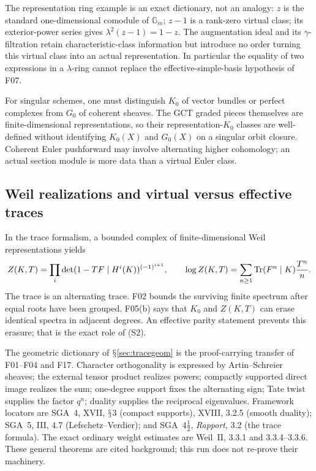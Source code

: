\documentclass[11pt,a4paper]{article}
\renewcommand{\S}{\ensuremath{\mathsection}}
\newcommand{\fid}[1]{\textsf{#1}}\newcommand{\gate}[1]{\textsf{#1}}
\theoremstyle{named}\newtheorem{finding}{Finding}[section]
\theoremstyle{definition}\newtheorem{definition}[finding]{Definition}
\theoremstyle{remark}\newtheorem{remark}[finding]{Remark}
\begin{document}
The representation ring example is an exact dictionary, not an analogy: $z$ is the standard one-dimensional comodule of $\mathbb G_m$; $z-1$ is a rank-zero virtual class; its exterior-power series gives $\lambda^2(z-1)=1-z$. The augmentation ideal and its $\gamma$-filtration retain characteristic-class information but introduce no order turning this virtual class into an actual representation. In particular the equality of two expressions in a $\lambda$-ring cannot replace the effective-simple-basis hypothesis of \fid{F07}.

For singular schemes, one must distinguish $K_0$ of vector bundles or perfect complexes from $G_0$ of coherent sheaves. The GCT graded pieces themselves are finite-dimensional representations, so their representation-$K_0$ classes are well-defined without identifying $K_0(X)$ and $G_0(X)$ on a singular orbit closure. Coherent Euler pushforward may involve alternating higher cohomology; an actual section module is more data than a virtual Euler class.

\subsection{Weil realizations and virtual versus effective traces}
In the trace formalism, a bounded complex of finite-dimensional Weil representations yields
\[
 Z(K,T)=\prod_i\det(1-TF\mid H^i(K))^{(-1)^{i+1}},\qquad
 \log Z(K,T)=\sum_{n\ge1}\operatorname{Tr}(F^n\mid K)\frac{T^n}{n}.
\]
The trace is an alternating trace. \fid{F02} bounds the surviving finite spectrum after equal roots have been grouped. \fid{F05}(b) says that $K_0$ and $Z(K,T)$ can erase identical spectra in adjacent degrees. An effective parity statement prevents this erasure; that is the exact role of (S2).

The geometric dictionary of \S\ref{sec:tracegeom} is the proof-carrying transfer of \fid{F01}--\fid{F04} and \fid{F17}. Character orthogonality is expressed by Artin--Schreier sheaves; the external tensor product realizes powers; compactly supported direct image realizes the sum; one-degree support fixes the alternating sign; Tate twist supplies the factor $q^n$; duality supplies the reciprocal eigenvalues. Framework locators are SGA~4, XVII, \S3 (compact supports), XVIII, 3.2.5 (smooth duality); SGA~5, III, 4.7 (Lefschetz--Verdier); and SGA~$4\frac12$, \emph{Rapport}, 3.2 (the trace formula). The exact ordinary weight estimates are Weil~II, 3.3.1 and 3.3.4--3.3.6. These general theorems are cited background; this run does not re-prove their machinery.
\end{document}
